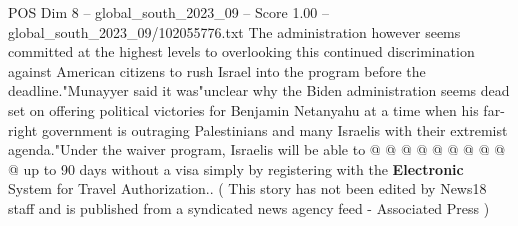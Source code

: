 \begin{textsample}{POS Dim 8 – global\_south\_2023\_09 – Score 1.00 – global\_south\_2023\_09/102055776.txt}
The administration however seems committed at the highest levels to overlooking this continued discrimination against American citizens to rush Israel into the program before the deadline."Munayyer said it was"unclear why the Biden administration seems dead set on offering political victories for Benjamin Netanyahu at a time when his far-right government is outraging Palestinians and many Israelis with their extremist agenda."Under the waiver program, Israelis will be able to @ @ @ @ @ @ @ @ @ @ up to 90 days without a visa simply by registering with the \textbf{Electronic} System for Travel Authorization.. ( This story has not been edited by News18 staff and is published from a syndicated news agency feed - Associated Press )

\end{textsample}
